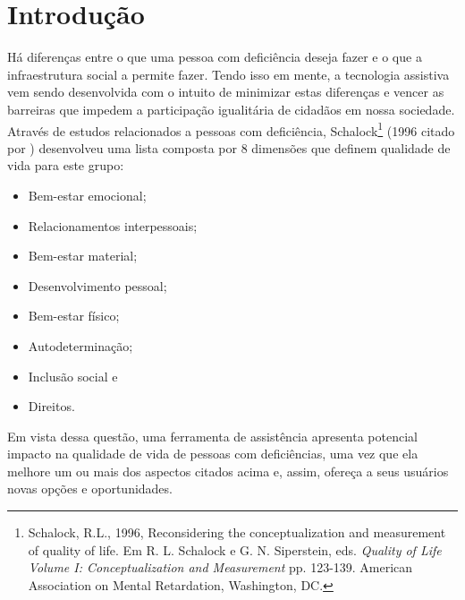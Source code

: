 \chapter{\label{chap:intro}Introdução}


Há diferenças entre o que uma pessoa com deficiência deseja fazer e o que a infraestrutura social a permite fazer. Tendo isso em mente, a tecnologia assistiva vem sendo desenvolvida com o intuito de minimizar estas diferenças e vencer as barreiras que impedem a participação igualitária de cidadãos em nossa sociedade. Através de estudos relacionados a pessoas com deficiência, Schalock\footnote{Schalock, R.L., 1996, Reconsidering the conceptualization and measurement of quality of life. Em R. L. Schalock e G. N. Siperstein, eds. \emph{Quality of Life Volume I: Conceptualization and Measurement} pp. 123-139. American Association on Mental Retardation, Washington, DC.} (1996 citado por \cite{hersh2010assistive}) desenvolveu uma lista composta por 8 dimensões que definem qualidade de vida para este grupo:
\begin{itemize}
    \item Bem-estar emocional;
    \item Relacionamentos interpessoais;
    \item Bem-estar material;
    \item Desenvolvimento pessoal;
    \item Bem-estar físico;
    \item Autodeterminação;
    \item Inclusão social e
    \item Direitos.
\end{itemize}
Em vista dessa questão, uma ferramenta de assistência apresenta potencial impacto na qualidade de vida de pessoas com deficiências, uma vez que ela melhore um ou mais dos aspectos citados acima e, assim, ofereça a seus usuários novas opções e oportunidades.

